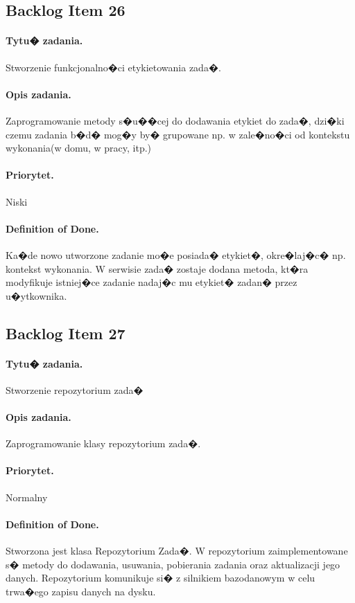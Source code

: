 ﻿\documentclass[a4paper]{article}
\begin{document}
\subsection{Backlog Item 26} 
\paragraph{Tytu� zadania.} Stworzenie funkcjonalno�ci etykietowania zada�.
\paragraph{Opis zadania.} Zaprogramowanie metody s�u��cej do dodawania etykiet do zada�, dzi�ki czemu zadania b�d� mog�y by� grupowane np. w zale�no�ci od kontekstu wykonania(w domu, w pracy, itp.)
\paragraph{Priorytet.} Niski
\paragraph{Definition of Done.} Ka�de nowo utworzone zadanie mo�e posiada� etykiet�, okre�laj�c� np. kontekst wykonania. W serwisie zada� zostaje dodana metoda, kt�ra modyfikuje istniej�ce zadanie nadaj�c mu etykiet� zadan� przez u�ytkownika.

\subsection{Backlog Item 27} 
\paragraph{Tytu� zadania.} Stworzenie repozytorium zada� 
\paragraph{Opis zadania.} Zaprogramowanie klasy repozytorium zada�.
\paragraph{Priorytet.} Normalny
\paragraph{Definition of Done.} Stworzona jest klasa Repozytorium Zada�. W repozytorium zaimplementowane s� metody do dodawania, usuwania, pobierania zadania  oraz aktualizacji jego danych. Repozytorium komunikuje si� z silnikiem bazodanowym w celu trwa�ego zapisu danych na dysku.
\end{document}
